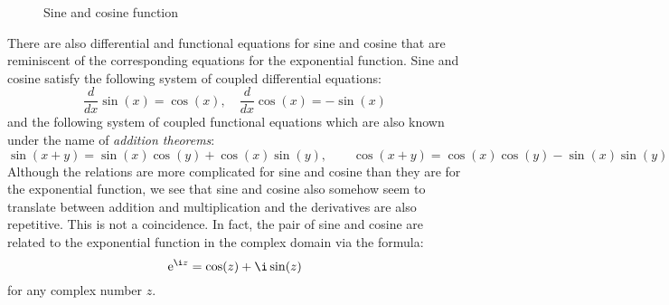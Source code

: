 \begin{figure}[h]
\centering
\caption{Sine and cosine function}
\label{Fig:SineAndCosine}
\end{figure}

There are also differential and functional equations for sine and cosine that are reminiscent of the corresponding equations for the exponential function. Sine and cosine satisfy the following system of coupled differential equations:
\begin{equation}
\frac{d}{dx} \sin(x) = \cos(x), \quad
\frac{d}{dx} \cos(x) = -\sin(x)
\end{equation}
and the following system of coupled functional equations which are also known under the name of \emph{addition theorems}:
\begin{equation}
\sin(x+y) = \sin(x) \cos(y) + \cos(x) \sin(y), \qquad
\cos(x+y) = \cos(x) \cos(y) - \sin(x) \sin(y)
\end{equation}
Although the relations are more complicated for sine and cosine than they are for the exponential function, we see that sine and cosine also somehow seem to translate between addition and multiplication and the derivatives are also repetitive. This is not a coincidence. In fact, the pair of sine and cosine are related to the exponential function in the complex domain via the formula:
\begin{equation}
\e^{\i z} = \cos(z) + \i \sin(z)
\end{equation}
for any complex number $z$. 








